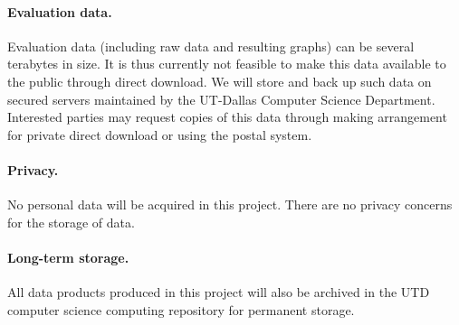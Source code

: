 \documentclass[10pt,letterpaper]{article}
\begin{document}
\paragraph{Evaluation data.} Evaluation data (including raw data and resulting graphs) can be several terabytes in size. It is thus currently not feasible to make this data available to the public through direct download. We will store and back up such data on secured servers maintained by the UT-Dallas Computer Science Department. Interested parties may request copies of this data through making arrangement for private direct download or using the postal system.

\paragraph{Privacy.} No personal data will be acquired in this project. There are no privacy concerns for the storage of data.

\paragraph{Long-term storage.} All data products produced in this project will also be archived in the UTD computer science computing repository for permanent storage.


\end{document}
